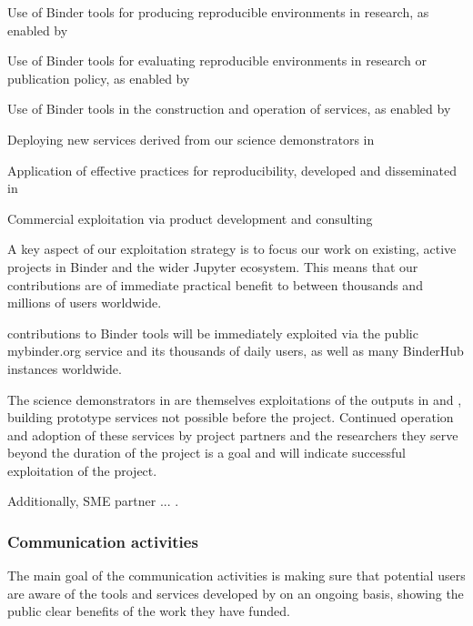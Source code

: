 \begin{compactenum}
  \item Use of Binder tools for producing reproducible environments in research, as enabled by 
  \item Use of Binder tools for evaluating reproducible environments in research or publication policy, as enabled by 
  \item Use of Binder tools in the construction and operation of services, as enabled by 
  \item Deploying new services derived from our science demonstrators in 
  \item Application of effective practices for reproducibility, developed and disseminated in 
  \item Commercial exploitation via product development and consulting 
\end{compactenum}

A key aspect of our exploitation strategy is to focus our work on existing,
active projects in Binder and the wider Jupyter ecosystem.
This means that our contributions are of immediate practical benefit to between thousands and millions of users worldwide.

\TheProject contributions to Binder tools will be immediately exploited via the public mybinder.org service
and its thousands of daily users, as well as many BinderHub instances worldwide.

The science demonstrators in  are themselves exploitations of the outputs
in  and ,
building prototype services not possible before the project.
Continued operation and adoption of these services by project partners and the researchers they serve beyond the duration of the project
is a goal and will indicate successful exploitation of the project.


Additionally, SME partner  ...
.

\subsubsection{Communication activities}

The main goal of the communication activities is making sure that potential users
are aware of the tools and services developed by \TheProject
on an ongoing basis,
showing the public clear benefits of the work they have funded.

